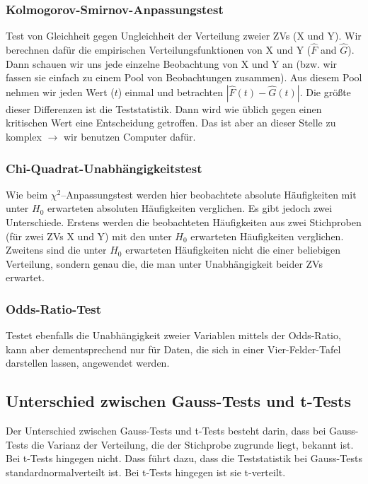 \documentclass[a4paper]{article}
\begin{document}
\subsubsection{Kolmogorov-Smirnov-Anpassungstest}\label{sec:KolSmi}
Test von Gleichheit gegen Ungleichheit der Verteilung zweier ZVs (X und Y). Wir berechnen dafür die empirischen Verteilungsfunktionen von X und Y ($\hat{F}$ and $\hat{G}$). Dann schauen wir uns jede einzelne Beobachtung von X und Y an (bzw. wir fassen sie einfach zu einem Pool von Beobachtungen zusammen). Aus diesem Pool nehmen wir jeden Wert ($t$) einmal und betrachten $|\hat{F}(t)-\hat{G}(t)|$. Die größte dieser Differenzen ist die Teststatistik. Dann wird wie üblich gegen einen kritischen Wert eine Entscheidung getroffen. Das ist aber an dieser Stelle zu komplex $\rightarrow$ wir benutzen Computer dafür.

\subsubsection{Chi-Quadrat-Unabhängigkeitstest}\label{sec:chitest2}
Wie beim $\chi^2$--Anpassungstest werden hier beobachtete absolute Häufigkeiten mit unter $H_0$ erwarteten absoluten Häufigkeiten verglichen. Es gibt jedoch zwei Unterschiede. Erstens werden die beobachteten Häufigkeiten aus zwei Stichproben (für zwei ZVs X und Y) mit den unter $H_0$ erwarteten Häufigkeiten verglichen. Zweitens sind die unter $H_0$ erwarteten Häufigkeiten nicht die einer beliebigen Verteilung, sondern genau die, die man unter Unabhängigkeit beider ZVs erwartet. %

\subsubsection{Odds-Ratio-Test}\label{sec:ORtest}
Testet ebenfalls die Unabhängigkeit zweier Variablen mittels der Odds-Ratio, kann aber dementsprechend nur für Daten, die sich in einer Vier-Felder-Tafel darstellen lassen, angewendet werden.


\subsection{Unterschied zwischen Gauss-Tests und t-Tests}\label{sec:Gaussvst}
Der Unterschied zwischen Gauss-Tests und t-Tests besteht darin, dass bei Gauss-Tests die Varianz der Verteilung, die der Stichprobe zugrunde liegt, bekannt ist. Bei t-Tests hingegen nicht. Dass führt dazu, dass die Teststatistik bei Gauss-Tests standardnormalverteilt ist. Bei t-Tests hingegen ist sie t-verteilt. \\
\end{document}
